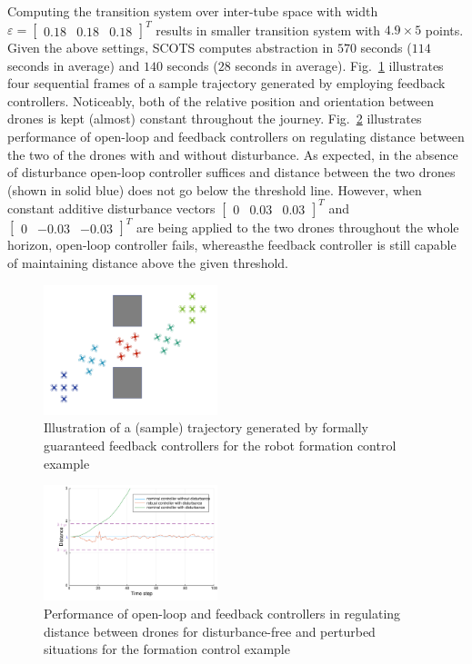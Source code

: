 Computing the transition system over inter-tube space with width $\varepsilon=\begin{bmatrix}0.18&0.18&0.18\end{bmatrix}^T$ results in smaller transition system with $4.9\times 5$ points. Given the above settings, SCOTS computes abstraction in $570$ seconds ($114$ seconds in average) and $140$ seconds ($28$ seconds in average). Fig.~\ref{fig:formation_ex} illustrates four sequential frames of a sample trajectory generated by employing feedback controllers. Noticeably, both of the relative position and orientation between drones is kept (almost) constant throughout the journey. Fig.~\ref{fig:formation_distance} illustrates performance of open-loop and feedback controllers on regulating distance between the two of the drones with and without disturbance. As expected, in the absence of disturbance open-loop controller suffices and distance between the two drones (shown in solid blue) does not go below the threshold line. However, when constant additive disturbance vectors $\begin{bmatrix}0 &0.03&0.03\end{bmatrix}^T$ and $\begin{bmatrix}0 &-0.03&-0.03\end{bmatrix}^T$ are being applied to the two drones throughout the whole horizon, open-loop controller fails, %
whereasthe feedback controller is still capable of maintaining distance above the given threshold.

 \begin{figure}[t]
	\centering
	\includegraphics[width=0.45\textwidth]{figures/formation.pdf}
	\caption{Illustration of a (sample) trajectory generated by formally guaranteed feedback controllers for the robot formation control example}
	\label{fig:formation_ex}
\end{figure}

\begin{figure}[t]
	\centering
	\includegraphics[width=0.45\textwidth]{figures/dist_formation.pdf}
	\caption{Performance of open-loop and feedback controllers in regulating distance between drones for disturbance-free and perturbed situations for the formation control example}
	\label{fig:formation_distance}
\end{figure}
 

